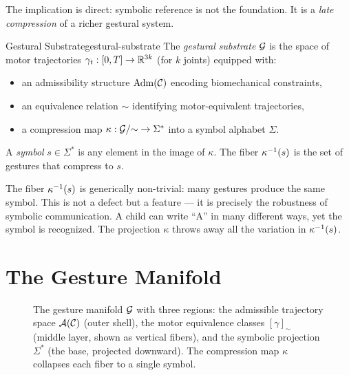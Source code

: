 The implication is direct: symbolic reference is not the foundation. It is a
\emph{late compression} of a richer gestural system.

\begin{definition}{Gestural Substrate}{gestural-substrate}
  The \emph{gestural substrate} $\mathcal{G}$ is the space of motor trajectories
  $\gamma_{t} : [0, T] \to \mathbb{R}^{3k}$ (for $k$ joints) equipped with:
  \begin{itemize}
    \item an admissibility structure $\mathrm{Adm}(\mathcal{C})$ encoding
          biomechanical constraints,
    \item an equivalence relation $\sim$ identifying motor-equivalent trajectories,
    \item a compression map $\kappa : \mathcal{G}/{\sim} \to \Sigma^*$ into a
          symbol alphabet $\Sigma$.
  \end{itemize}
  A \emph{symbol} $s \in \Sigma^*$ is any element in the image of $\kappa$.
  The fiber $\kappa^{-1}(s)$ is the set of gestures that compress to $s$.
\end{definition}

\begin{remark}
  The fiber $\kappa^{-1}(s)$ is generically non-trivial: many gestures
  produce the same symbol. This is not a defect but a feature — it is precisely
  the robustness of symbolic communication. A child can write ``A'' in many
  different ways, yet the symbol is recognized. The projection $\kappa$ throws
  away all the variation in $\kappa^{-1}(s)$.
\end{remark}

\section{The Gesture Manifold}

\begin{figure}[h]
  \centering
  \begin{tikzpicture}[scale=1.0]
    
  \end{tikzpicture}
  \caption{The gesture manifold $\mathcal{G}$ with three regions: the
    admissible trajectory space $\mathcal{A}(\mathcal{C})$ (outer shell), the
    motor equivalence classes $[\gamma]_\sim$ (middle layer, shown as
    vertical fibers), and the symbolic projection $\Sigma^*$ (the base,
    projected downward). The compression map $\kappa$ collapses each fiber
    to a single symbol.}
  \label{fig:gesture-manifold}
\end{figure}

